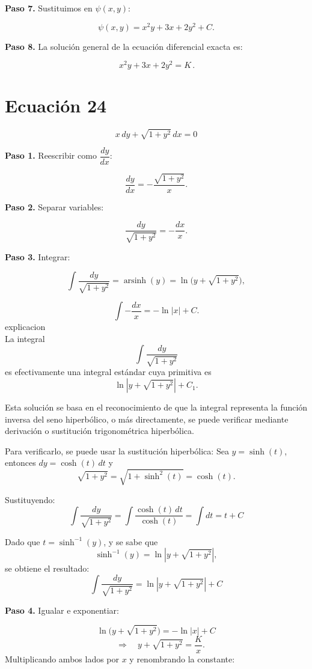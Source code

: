 \documentclass[12pt,a4paper]{article}
\begin{document}
\begin{multicols}{2}
	\textbf{Paso 7.} Sustituimos en \(\psi(x,y)\):
	
	\[
	\psi(x,y) = x^2y + 3x + 2y^2 + C.
	\]
	
	\textbf{Paso 8.} La solución general de la ecuación diferencial exacta es:
	
	\[
	\boxed{\,x^2y + 3x + 2y^2 = K\,}.
	\]
	
	\section*{Ecuación 24}
	
	\[
	x\,dy + \sqrt{1+y^{2}}\,dx = 0
	\]
	
	\textbf{Paso 1.} Reescribir como \(\dfrac{dy}{dx}\):
	
	\[
	\frac{dy}{dx} = -\frac{\sqrt{1+y^{2}}}{x}.
	\]
	
	\textbf{Paso 2.} Separar variables:
	
	\[
	\frac{dy}{\sqrt{1+y^{2}}} = -\frac{dx}{x}.
	\]
	
	\textbf{Paso 3.} Integrar:
	
	\[
	\int \frac{dy}{\sqrt{1+y^{2}}} = \operatorname{arsinh}(y) = \ln\big(y + \sqrt{1+y^2}\big),
	\]
	
	\[
	\int -\frac{dx}{x} = -\ln|x| + C.
	\]
	explicacion\\
	La integral
	\[
	\int \frac{dy}{\sqrt{1+y^2}}
	\]
	es efectivamente una integral estándar cuya primitiva es
	\[
	\ln \left| y + \sqrt{1+y^2} \right| + C_1.
	\]
	
	Esta solución se basa en el reconocimiento de que la integral representa la función inversa del seno hiperbólico, o más directamente, se puede verificar mediante derivación o sustitución trigonométrica hiperbólica.
	
	Para verificarlo, se puede usar la sustitución hiperbólica:  
	Sea \( y = \sinh(t) \), entonces \( dy = \cosh(t)\,dt \) y
	\[
	\sqrt{1+y^2} = \sqrt{1+\sinh^2(t)} = \cosh(t).
	\]
	
	Sustituyendo:
	\[
	\int \frac{dy}{\sqrt{1+y^2}} = \int \frac{\cosh(t)\,dt}{\cosh(t)} = \int dt = t + C
	\]
	
	Dado que \( t = \sinh^{-1}(y) \), y se sabe que
	\[
	\sinh^{-1}(y) = \ln \left| y + \sqrt{1+y^2} \right|,
	\]
	se obtiene el resultado:
	\[
	\int \frac{dy}{\sqrt{1+y^2}} = \ln \left| y + \sqrt{1+y^2} \right| + C
	\]
	
	\textbf{Paso 4.} Igualar e exponentiar:
	
	\[
	\ln\big(y + \sqrt{1+y^2}\big) = -\ln|x| + C
	\]
	\[
	\quad \Rightarrow \quad
	y+\sqrt{1+y^2} = \frac{K}{x}.\]
	Multiplicando ambos lados por \(x\) y renombrando la constante:
	

\end{multicols}
\end{document}
